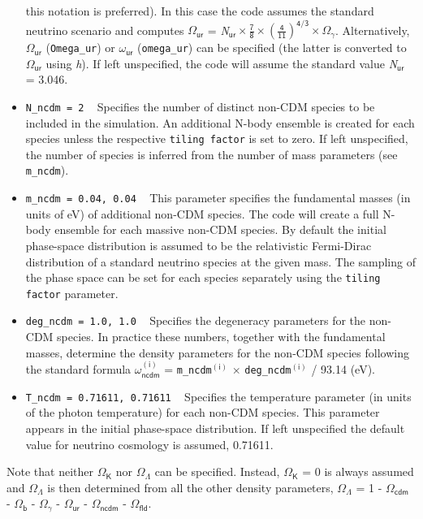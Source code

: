 \documentclass[a4paper,10pt]{article}
\begin{document}
\begin{itemize}
 this notation is preferred). In this case the code assumes the standard neutrino scenario and computes $\mathsf{\Omega}_\mathsf{ur}$ =
 \textit{N}$_\mathsf{ur} \times \frac{\mathsf{7}}{\mathsf{8}} \times \left(\frac{\mathsf{4}}{\mathsf{11}}\right)^{\mathsf{4}/\mathsf{3}}
 \times \mathsf{\Omega}_\mathsf{\gamma}$. Alternatively, $\mathsf{\Omega}_\mathsf{ur}$ (\texttt{Omega\_ur}) or $\mathsf{\omega}_\mathsf{ur}$
 (\texttt{omega\_ur}) can be specified (the latter is converted to $\mathsf{\Omega}_\mathsf{ur}$ using \textit{h}). If left unspecified, the
 code will assume the standard value \textit{N}$_\mathsf{ur}$ = 3.046.
 \item[] \hspace{-25pt}\texttt{N\_ncdm = 2} ~ Specifies the number of distinct non-CDM species to be included in the simulation. An
 additional N-body ensemble is created for each species unless the respective \texttt{tiling factor} is set to zero. If left unspecified,
 the number of species is inferred from the number of mass parameters (see \texttt{m\_ncdm}).
 \item[] \hspace{-25pt}\texttt{m\_ncdm = 0.04, 0.04} ~ This parameter specifies the fundamental masses (in units of eV) of additional
 non-CDM species. The code will create a full N-body ensemble for each massive non-CDM species. By default the initial phase-space
 distribution is assumed to be the relativistic Fermi-Dirac distribution of a standard neutrino species at the given mass. The sampling
 of the phase space can be set for each species separately using the \texttt{tiling factor} parameter.
 \item[] \hspace{-25pt}\texttt{deg\_ncdm = 1.0, 1.0} ~ Specifies the degeneracy parameters for the non-CDM species. In practice these
 numbers, together with the fundamental masses, determine the density parameters for the non-CDM species following the standard formula
 $\mathsf{\omega}_\mathsf{ncdm}^{\mathsf{(i)}}$ = \texttt{m\_ncdm}$^{\mathsf{(i)}}$ $\times$ \texttt{deg\_ncdm}$^{\mathsf{(i)}}$ / 93.14 (eV).
 \item[] \hspace{-25pt}\texttt{T\_ncdm = 0.71611, 0.71611} ~ Specifies the temperature parameter (in units of the photon temperature) for
 each non-CDM species. This parameter appears in the initial phase-space distribution. If left unspecified the default value for neutrino
 cosmology is assumed, 0.71611.
\end{itemize}
\noindent Note that neither $\mathsf{\Omega}_\mathsf{K}$ nor $\mathsf{\Omega}_\mathsf{\Lambda}$ can be specified. Instead,
$\mathsf{\Omega}_\mathsf{K}$ = 0 is always assumed and $\mathsf{\Omega}_\mathsf{\Lambda}$ is then determined from all the other density
parameters, $\mathsf{\Omega}_\mathsf{\Lambda}$ = 1 - $\mathsf{\Omega}_\mathsf{cdm}$ - $\mathsf{\Omega}_\mathsf{b}$ -
$\mathsf{\Omega}_\mathsf{\gamma}$ - $\mathsf{\Omega}_\mathsf{ur}$ - $\mathsf{\Omega}_\mathsf{ncdm}$ - $\mathsf{\Omega}_\mathsf{fld}$.
\end{document}
